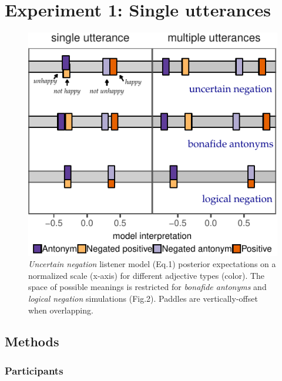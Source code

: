 \documentclass[floatsintext,doc]{apa6}
\begin{document}
\section{Experiment 1: Single utterances}



\begin{figure}[t]
\centering \includegraphics{figs/modelPredictions-1} 
\caption{ \emph{Uncertain negation} listener model (Eq.1) posterior expectations on a normalized scale (x-axis) for different adjective types (color). The space of possible meanings is restricted for \emph{bonafide antonyms} and \emph{logical negation} simulations (Fig.2). Paddles are vertically-offset when overlapping.}\label{fig:modelPredictions}
\end{figure}


\subsection{Methods}
\subsubsection{Participants}\label{participants}%
\end{document}
